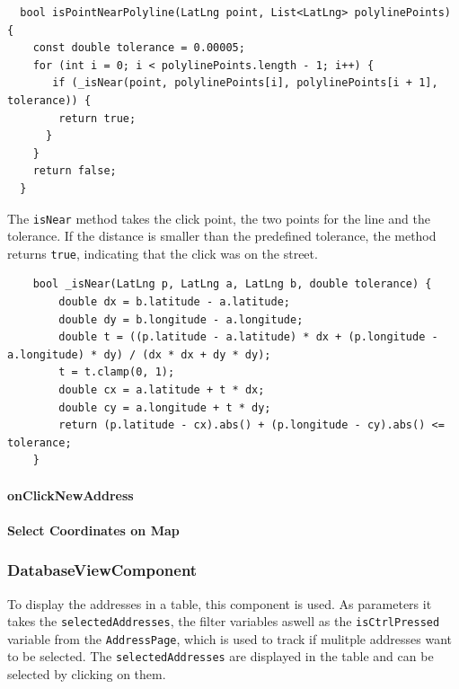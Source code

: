 \lstset{style=mycsharp, caption=isPointNearPolyline method}
\begin{lstlisting}
  bool isPointNearPolyline(LatLng point, List<LatLng> polylinePoints) {
    const double tolerance = 0.00005;
    for (int i = 0; i < polylinePoints.length - 1; i++) {
       if (_isNear(point, polylinePoints[i], polylinePoints[i + 1], tolerance)) {
        return true;
      }
    }
    return false;
  }
\end{lstlisting}

The \texttt{isNear} method takes the click point, the two points for the line and the tolerance. If the distance is smaller than the predefined tolerance, the method returns \texttt{true}, indicating that the click was on the street.

\lstset{style=mycsharp, caption=isNear method}
\begin{lstlisting}
    bool _isNear(LatLng p, LatLng a, LatLng b, double tolerance) {
        double dx = b.latitude - a.latitude;
        double dy = b.longitude - a.longitude;
        double t = ((p.latitude - a.latitude) * dx + (p.longitude - a.longitude) * dy) / (dx * dx + dy * dy); 
        t = t.clamp(0, 1);
        double cx = a.latitude + t * dx;
        double cy = a.longitude + t * dy;
        return (p.latitude - cx).abs() + (p.longitude - cy).abs() <= tolerance;
    }
\end{lstlisting}


\paragraph{onClickNewAddress}

\paragraph{Select Coordinates on Map}
\label{fig:Select Coordinates on Map}

\subsubsection{DatabaseViewComponent}
\label{fig:DatabaseViewComponent}
To display the addresses in a table, this component is used. As parameters it takes the \texttt{selectedAddresses}, the filter variables aswell as the \texttt{isCtrlPressed} variable from the \texttt{AddressPage}, which is used to track if mulitple addresses want to be selected. The \texttt{selectedAddresses} are displayed in the table and can be selected by clicking on them. \\

